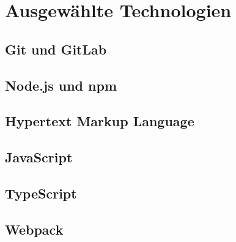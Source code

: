 \chapter{Ausgewählte Technologien}
\section{Git und GitLab}

\section{Node.js und npm}

\section{Hypertext Markup Language}

\section{JavaScript}

\section{TypeScript}

\section{Webpack}